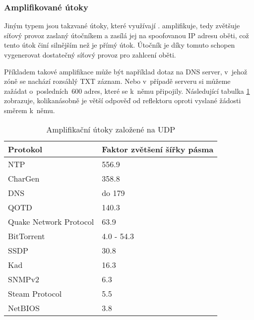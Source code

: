 \subsubsection{Amplifikované útoky}
Jiným typem jsou takzvané  útoky, které využívají .
 amplifikuje, tedy zvětšuje síťový provoz zaslaný útočníkem a zasílá jej na
spoofovanou IP adresu oběti, což tento útok činí silnějším než je přímý útok. Útočník je díky
tomuto schopen vygenerovat dostatečný síťový provoz pro zahlcení oběti.

Příkladem takové amplifikace může být například dotaz na DNS server, v~jehož zóně se nachází
rozsáhlý TXT záznam. Nebo v~případě  serveru si můžeme zažádat o~posledních~600
adres, které se k~němu připojily. Následující tabulka \ref{tab:udp_ampl} zobrazuje,
kolikanásobně je větší odpověď od reflektoru oproti vyslané žádosti směrem k~němu.

\begin{table}[]
	\centering
	\caption{Amplifikační útoky založené na UDP \cite{TA14-017A}}
	\label{tab:udp_ampl}
	\begin{tabular}{|l|l|}
		\hline
		Protokol               & Faktor zvětšení šířky pásma    \\ \hline
		NTP                    & 556.9                          \\ \hline
		CharGen                & 358.8                          \\ \hline
		DNS                    & do 179                         \\ \hline
		QOTD                   & 140.3                          \\ \hline
		Quake Network Protocol & 63.9                           \\ \hline
		BitTorrent             & 4.0 - 54.3                     \\ \hline
		SSDP                   & 30.8                           \\ \hline
		Kad                    & 16.3                           \\ \hline
		SNMPv2                 & 6.3                            \\ \hline
		Steam Protocol         & 5.5                            \\ \hline
		NetBIOS                & 3.8                            \\ \hline
	\end{tabular}
\end{table}

